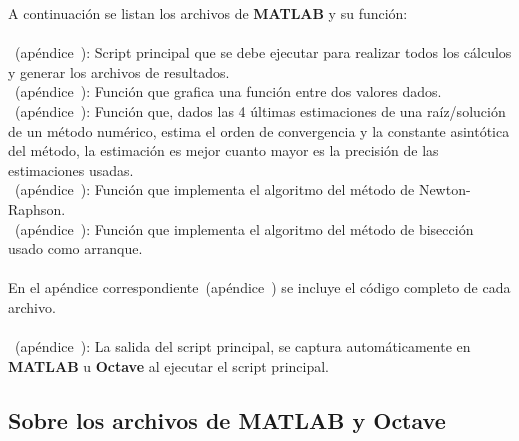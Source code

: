 
A continuación se listan los archivos de \textbf{MATLAB} y su función: \\\\


\textbf{}~(apéndice~): Script principal que se debe ejecutar para realizar todos los cálculos y generar los archivos de resultados.\\

\textbf{}~(apéndice~): Función que grafica una función entre dos valores dados.\\

\textbf{}~(apéndice~): Función que, dados las 4 últimas estimaciones de una raíz/solución de un método numérico, estima el orden de convergencia y la constante asintótica del método, la estimación es mejor cuanto mayor es la precisión de las estimaciones usadas.\\

\textbf{}~(apéndice~): Función que implementa el algoritmo del método de Newton-Raphson.\\

\textbf{}~(apéndice~): Función que implementa el algoritmo del método de bisección usado como arranque.\\\\

En el apéndice correspondiente~(apéndice~) se incluye el código completo de cada archivo.\\\\

\textbf{}~(apéndice~): La salida del script principal, se captura automáticamente en \textbf{MATLAB} u \textbf{Octave} al ejecutar el script principal.

\clearpage

\subsection{Sobre los archivos de \textbf{MATLAB} y \textbf{Octave}}

